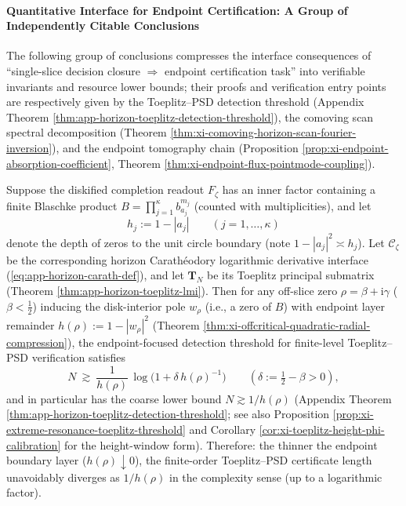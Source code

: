 \paragraph{Quantitative Interface for Endpoint Certification: A Group of Independently Citable Conclusions}
The following group of conclusions compresses the interface consequences of ``single-slice decision closure \(\Rightarrow\) endpoint certification task'' into verifiable invariants and resource lower bounds; their proofs and verification entry points are respectively given by the Toeplitz--PSD detection threshold (Appendix Theorem \ref{thm:app-horizon-toeplitz-detection-threshold}), the comoving scan spectral decomposition (Theorem \ref{thm:xi-comoving-horizon-scan-fourier-inversion}), and the endpoint tomography chain (Proposition \ref{prop:xi-endpoint-absorption-coefficient}, Theorem \ref{thm:xi-endpoint-flux-pointmode-coupling}).

\begin{proposition}\label{con:xi-toeplitz-length-depth-duality}
Suppose the diskified completion readout \(F_{\zeta}\) has an inner factor containing a finite Blaschke product
\(
B=\prod_{j=1}^{\kappa}b_{a_j}^{m_j}
\)
(counted with multiplicities), and let
\[
h_j:=1-|a_j|
\qquad(j=1,\dots,\kappa)
\]
denote the depth of zeros to the unit circle boundary (note \(1-|a_j|^2\asymp h_j\)).
Let \(\mathscr{C}_{\zeta}\) be the corresponding horizon Carath\'eodory logarithmic derivative interface (\eqref{eq:app-horizon-carath-def}), and let \(\mathbf{T}_N\) be its Toeplitz principal submatrix (Theorem \ref{thm:app-horizon-toeplitz-lmi}).
Then for any off-slice zero \(\rho=\beta+\mathrm{i}\gamma\) (\(\beta<\tfrac12\)) inducing the disk-interior pole \(w_\rho\) (i.e., a zero of \(B\)) with endpoint layer remainder
\(
h(\rho):=1-|w_\rho|^2
\)
(Theorem \ref{thm:xi-offcritical-quadratic-radial-compression}), the endpoint-focused detection threshold for finite-level Toeplitz--PSD verification satisfies
\[
N\ \gtrsim\ \frac{1}{h(\rho)}\,\log\!\bigl(1+\delta\,h(\rho)^{-1}\bigr)
\qquad(\delta:=\tfrac12-\beta>0),
\]
and in particular has the coarse lower bound \(N\gtrsim 1/h(\rho)\) (Appendix Theorem \ref{thm:app-horizon-toeplitz-detection-threshold}; see also Proposition \ref{prop:xi-extreme-resonance-toeplitz-threshold} and Corollary \ref{cor:xi-toeplitz-height-phi-calibration} for the height-window form).
Therefore: the thinner the endpoint boundary layer (\(h(\rho)\downarrow 0\)), the finite-order Toeplitz--PSD certificate length unavoidably diverges as \(1/h(\rho)\) in the complexity sense (up to a logarithmic factor).
\end{proposition}

